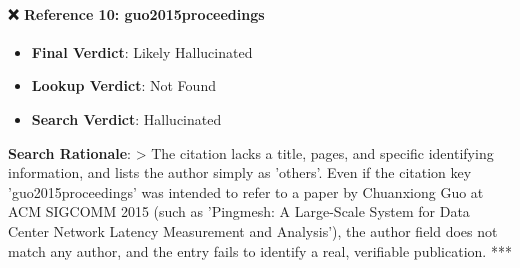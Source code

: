 \documentclass[11pt,a4paper]{article}
\begin{document}
\paragraph{❌ Reference 10: guo2015proceedings}
\begin{itemize}[leftmargin=1.8em,itemsep=2pt]
\item \textbf{Final Verdict}: Likely Hallucinated
\item \textbf{Lookup Verdict}: Not Found
\item \textbf{Search Verdict}: Hallucinated
\end{itemize}
\textbf{Search Rationale}:
> The citation lacks a title, pages, and specific identifying information, and lists the author simply as 'others'. Even if the citation key 'guo2015proceedings' was intended to refer to a paper by Chuanxiong Guo at ACM SIGCOMM 2015 (such as 'Pingmesh: A Large-Scale System for Data Center Network Latency Measurement and Analysis'), the author field does not match any author, and the entry fails to identify a real, verifiable publication.
***
\end{document}
